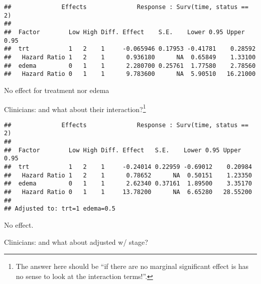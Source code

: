 \documentclass[]{book}
\newenvironment{Shaded}{\begin{snugshade}}{\end{snugshade}}
\newcommand{\KeywordTok}[1]{\textcolor[rgb]{0.13,0.29,0.53}{\textbf{{#1}}}}
\newcommand{\DataTypeTok}[1]{\textcolor[rgb]{0.13,0.29,0.53}{{#1}}}
\newcommand{\DecValTok}[1]{\textcolor[rgb]{0.00,0.00,0.81}{{#1}}}
\newcommand{\StringTok}[1]{\textcolor[rgb]{0.31,0.60,0.02}{{#1}}}
\newcommand{\NormalTok}[1]{{#1}}
\let\rmarkdownfootnote\footnote%
\def\footnote{\protect\rmarkdownfootnote}
\theoremstyle{definition}
\theoremstyle{definition}
\theoremstyle{definition}
\theoremstyle{remark}
\begin{document}
\begin{verbatim}
##              Effects              Response : Surv(time, status == 2) 
## 
##  Factor        Low High Diff. Effect    S.E.    Lower 0.95 Upper 0.95
##  trt           1   2    1     -0.065946 0.17953 -0.41781    0.28592  
##   Hazard Ratio 1   2    1      0.936180      NA  0.65849    1.33100  
##  edema         0   1    1      2.280700 0.25761  1.77580    2.78560  
##   Hazard Ratio 0   1    1      9.783600      NA  5.90510   16.21000
\end{verbatim}

No effect for treatment nor edema

Clinicians: and what about their interaction?\footnote{The answer here
  should be ``if there are no marginal significant effect is has no
  sense to look at the interaction terms!''.}

\begin{Shaded}
\end{Shaded}

\begin{verbatim}
##              Effects              Response : Surv(time, status == 2) 
## 
##  Factor        Low High Diff. Effect   S.E.    Lower 0.95 Upper 0.95
##  trt           1   2    1     -0.24014 0.22959 -0.69012    0.20984  
##   Hazard Ratio 1   2    1      0.78652      NA  0.50151    1.23350  
##  edema         0   1    1      2.62340 0.37161  1.89500    3.35170  
##   Hazard Ratio 0   1    1     13.78200      NA  6.65280   28.55200  
## 
## Adjusted to: trt=1 edema=0.5
\end{verbatim}

No effect.

Clinicians: and what about adjusted w/ stage?

\begin{Shaded}
\end{Shaded}
\end{document}
